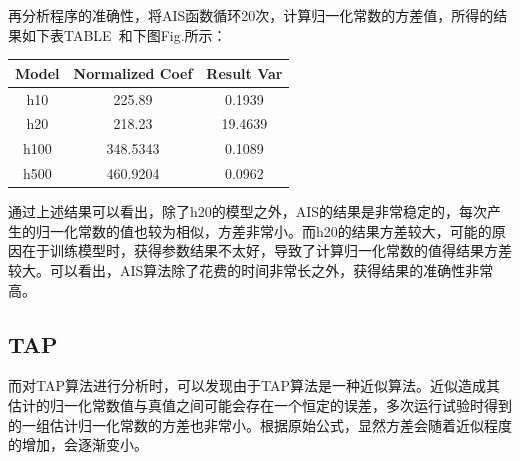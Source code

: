 \documentclass[journal,a4paper]{IEEEtran}
\begin{document}
		再分析程序的准确性，将AIS函数循环20次，计算归一化常数的方差值，所得的结果如下表TABLE~和下图Fig.所示：
		\begin{center}
		\begin{tabular}{c|cc}
			\hline
			Model & Normalized Coef& Result Var \\
			\hline
			h10 & 225.89 & 0.1939 \\
			h20 & 218.23 & 19.4639 \\
			h100 & 348.5343 & 0.1089 \\
			h500 & 460.9204 & 0.0962\\
			\hline
		\end{tabular}
		\end{center}
		通过上述结果可以看出，除了h20的模型之外，AIS的结果是非常稳定的，每次产生的归一化常数的值也较为相似，方差非常小。而h20的结果方差较大，可能的原因在于训练模型时，获得参数结果不太好，导致了计算归一化常数的值得结果方差较大。可以看出，AIS算法除了花费的时间非常长之外，获得结果的准确性非常高。

	\subsection{TAP}
		而对TAP算法进行分析时，可以发现由于TAP算法是一种近似算法。近似造成其估计的归一化常数值与真值之间可能会存在一个恒定的误差，多次运行试验时得到的一组估计归一化常数的方差也非常小。根据原始公式，显然方差会随着近似程度的增加，会逐渐变小。
		
\end{document}
